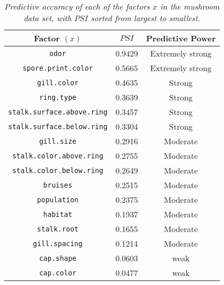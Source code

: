 \documentclass[12pt]{article}
\begin{document}
\begin{itemize}
\begin{table}[t!]

\centering

\caption{\textit{Predictive accuracy of each of the factors $x$ in the mushroom data set, with $PSI$ sorted from largest to smallest.}}

\bigskip

\begin{tabular}{c|cc}

Factor $( x )$ & $PSI$ & Predictive Power \\

\hline

\texttt{odor} & 0.9429 & Extremely strong \\

\texttt{spore.print.color} & 0.5665 & Extremely strong \\

\texttt{gill.color} & 0.4635 & Strong \\

\texttt{ring.type} & 0.3639 & Strong \\

\texttt{stalk.surface.above.ring} & 0.3457 & Strong \\

\texttt{stalk.surface.below.ring} & 0.3304 & Strong \\

\texttt{gill.size} & 0.2916 & Moderate \\

\texttt{stalk.color.above.ring} & 0.2755 & Moderate \\

\texttt{stalk.color.below.ring} & 0.2649 & Moderate \\

\texttt{bruises} & 0.2515 & Moderate \\

\texttt{population} & 0.2375 & Moderate \\

\texttt{habitat} & 0.1937 & Moderate \\

\texttt{stalk.root} & 0.1655 & Moderate \\

\texttt{gill.spacing} & 0.1214 & Moderate \\ 

\texttt{cap.shape} & 0.0603 & weak \\

\texttt{cap.color} & 0.0477 & weak \\


\end{tabular}
\end{table}
\end{itemize}
\end{document}
